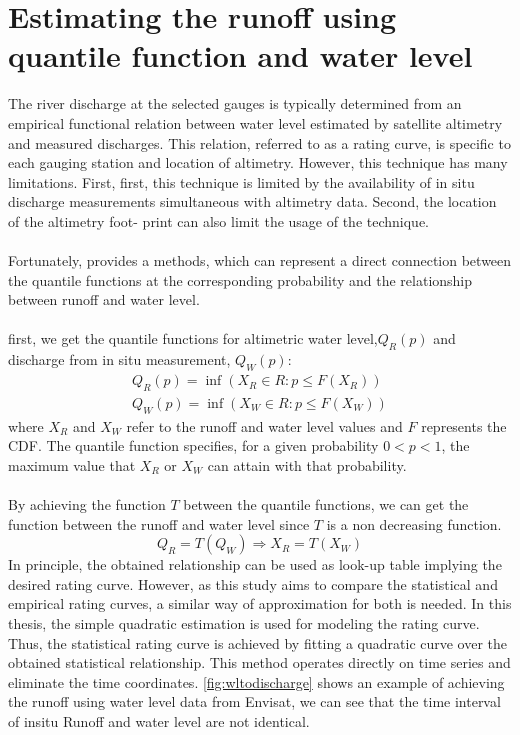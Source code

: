 \section{Estimating the runoff using quantile function and water level}\label{sec:waterlevel}
The river discharge at the selected gauges is typically determined from an empirical functional relation between water level estimated by satellite altimetry and measured discharges. This relation, referred to as a rating curve, is specific to each gauging station and location of altimetry. However, this technique has many limitations. First, first, this technique is limited by the availability of in situ discharge measurements simultaneous with altimetry data. Second, the location of the altimetry foot- print can also limit the usage of the technique.\\\\
Fortunately, \cite{tourian2013quantile} provides a methods, which can represent a direct connection between the quantile functions at the corresponding probability and the relationship between runoff and water level. \\\\
first, we get the quantile functions for altimetric water level,$Q_R(p)$ and discharge from in situ measurement, $Q_W(p)$:
\begin{gather*}
	Q_R(p) = \inf(X_R \in R: p\leq F(X_R)) \\
	Q_W(p) = \inf(X_W \in R: p\leq F(X_W)) 
\end{gather*}
where $X_R$ and $X_W$ refer to the runoff and water level values and $F$ represents the CDF. The quantile function specifies, for a given probability $0 < p < 1$, the maximum value that $X_R$ or $X_W$ can attain with that probability.\\\\
By achieving the function $T$ between the quantile functions, we can get the function between the runoff and water level since $T$ is a non decreasing function. 
\begin{equation}
	Q_R = T(Q_W) \Longrightarrow X_R = T(X_W)
\end{equation}
In principle, the obtained relationship can be used as look-up table implying the desired rating curve. However, as this study aims to compare the statistical and empirical rating curves, a similar way of approximation for both is needed. In this thesis, the simple quadratic estimation is used for modeling the rating curve. Thus, the statistical rating curve is achieved by fitting a quadratic curve over the obtained statistical relationship. This method operates directly on time series and eliminate the time coordinates. \autoref{fig:wltodischarge} shows an example of achieving the runoff using water level data from Envisat, we can see that the time interval of insitu Runoff and water level are not identical. 
